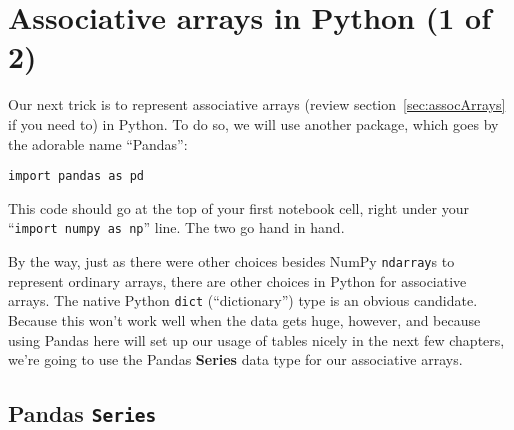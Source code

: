 

\chapter{Associative arrays in Python (1 of 2)}
\label{ch:pythonAssocArrays}

Our next trick is to represent associative arrays (review
section~\ref{sec:assocArrays} if you need to) in Python. To do so, we will
use another package, which goes by the adorable name ``Pandas'':

\begin{Verbatim}[fontsize=\small,samepage=true,frame=single,framesep=3mm]
import pandas as pd
\end{Verbatim}

This code should go at the top of your first notebook cell, right under your
``\texttt{import numpy as np}'' line. The two go hand in hand.

By the way, just as there were other choices besides NumPy \texttt{ndarray}s to
represent ordinary arrays, there are other choices in Python for associative
arrays. The native Python \texttt{dict} (``dictionary'') type is an obvious
candidate. Because this won't work well when the data gets huge, however, and
because using Pandas here will set up our usage of tables nicely in the next
few chapters, we're going to use the Pandas \textbf{Series} data type for our
associative arrays.


\section{Pandas \texttt{Series}}
